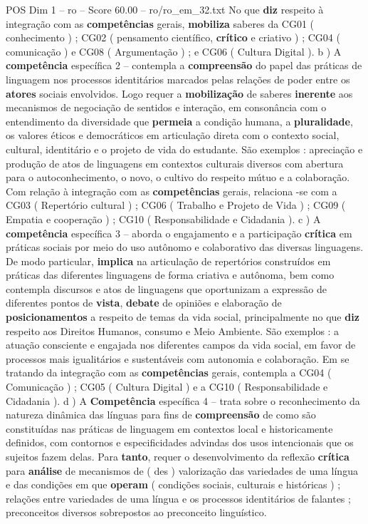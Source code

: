 \begin{textsample}{POS Dim 1 – ro – Score 60.00 – ro/ro\_em\_32.txt}
No que \textbf{diz} respeito à integração com as \textbf{competências} gerais, \textbf{mobiliza} saberes da CG01 ( conhecimento ) ; CG02 ( pensamento científico, \textbf{crítico} e criativo ) ; CG04 ( comunicação ) e CG08 ( Argumentação ) ; e CG06 ( Cultura Digital ). b ) A \textbf{competência} específica 2 – contempla a \textbf{compreensão} do papel das práticas de linguagem nos processos identitários marcados pelas relações de poder entre os \textbf{atores} sociais envolvidos.
Logo requer a \textbf{mobilização} de saberes \textbf{inerente} aos mecanismos de negociação de sentidos e interação, em consonância com o entendimento da diversidade que \textbf{permeia} a condição humana, a \textbf{pluralidade}, os valores éticos e democráticos em articulação direta com o contexto social, cultural, identitário e o projeto de vida do estudante.
São exemplos : apreciação e produção de atos de linguagens em contextos culturais diversos com abertura para o autoconhecimento, o novo, o cultivo do respeito mútuo e a colaboração.
Com relação à integração com as \textbf{competências} gerais, relaciona -se com a CG03 ( Repertório cultural ) ; CG06 ( Trabalho e Projeto de Vida ) ; CG09 ( Empatia e cooperação ) ; CG10 ( Responsabilidade e Cidadania ). c ) A \textbf{competência} específica 3 – aborda o engajamento e a participação \textbf{crítica} em práticas sociais por meio do uso autônomo e colaborativo das diversas linguagens.
De modo particular, \textbf{implica} na articulação de repertórios construídos em práticas das diferentes linguagens de forma criativa e autônoma, bem como contempla discursos e atos de linguagens que oportunizam a expressão de diferentes pontos de \textbf{vista}, \textbf{debate} de opiniões e elaboração de \textbf{posicionamentos} a respeito de temas da vida social, principalmente no que \textbf{diz} respeito aos Direitos Humanos, consumo e Meio Ambiente.
São exemplos : a atuação consciente e engajada nos diferentes campos da vida social, em favor de processos mais igualitários e sustentáveis com autonomia e colaboração.
Em se tratando da integração com as \textbf{competências} gerais, contempla a CG04 ( Comunicação ) ; CG05 ( Cultura Digital ) e a CG10 ( Responsabilidade e Cidadania ). d ) A \textbf{Competência} específica 4 – trata sobre o reconhecimento da natureza dinâmica das línguas para fins de \textbf{compreensão} de como são constituídas nas práticas de linguagem em contextos local e historicamente definidos, com contornos e especificidades advindas dos usos intencionais que os sujeitos fazem delas.
Para \textbf{tanto}, requer o desenvolvimento da reflexão \textbf{crítica} para \textbf{análise} de mecanismos de ( des ) valorização das variedades de uma língua e das condições em que \textbf{operam} ( condições sociais, culturais e históricas ) ; relações entre variedades de uma língua e os processos identitários de falantes ; preconceitos diversos sobrepostos ao preconceito linguístico.

\end{textsample}
